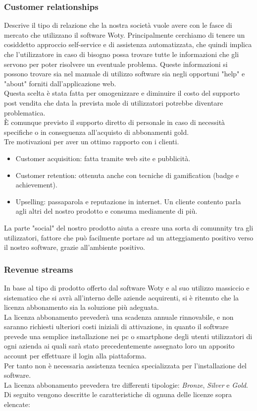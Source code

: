 \subsubsection{Customer relationships}
Descrive il tipo di relazione che la nostra società vuole avere con le fasce di mercato che utilizzano il software Woty. Principalmente cerchiamo di tenere un cosiddetto approccio self-service e di assistenza automatizzata, che quindi implica che l'utilizzatore in caso di bisogno possa trovare tutte le informazioni che gli servono per poter risolvere un eventuale problema. Queste informazioni si possono trovare sia nel manuale di utilizzo software sia negli opportuni "help" e "about" forniti dall'applicazione web.\\
Questa scelta è stata fatta per omogenizzare e diminuire il costo del supporto post vendita che data la prevista mole di utilizzatori potrebbe diventare problematica.\\
È comunque previsto il supporto diretto di personale in caso di necessità specifiche o in conseguenza all'acquisto di abbonamenti gold. \\ Tre motivazioni per aver un ottimo rapporto con i clienti.
\begin{itemize}
\item Customer acquisition: fatta tramite web site e pubblicità.
\item Customer retention: ottenuta anche con tecniche di gamification (badge e achievement).
\item Upselling: passaparola e reputazione in internet. Un cliente contento parla agli altri del nostro prodotto e consuma mediamente di più.
\end{itemize}
La parte "social" del nostro prodotto aiuta a creare una sorta di comunnity tra gli utilizzatori, fattore che può facilmente portare ad un atteggiamento positivo verso il nostro software, grazie all'ambiente positivo.

\subsubsection{Revenue streams}
In base al tipo di prodotto offerto dal software Woty e al suo utilizzo massiccio e sistematico che si avrà all'interno delle aziende acquirenti, si è ritenuto che la licenza abbonamento sia la soluzione più adeguata.\\
La licenza abbonamento prevederà una scadenza annuale rinnovabile, e non saranno richiesti ulteriori costi iniziali di attivazione, in quanto il software prevede una semplice installazione nei pc o smartphone degli utenti utilizzatori di ogni azienda ai quali sarà stato precedentemente assegnato loro un apposito account per effettuare il login alla piattaforma.\\
Per tanto non è necessaria assistenza tecnica specializzata per l'installazione del software.\\
La licenza abbonamento prevedera tre differenti tipologie: \textit{Bronze}, \textit{Silver} e \textit{Gold}.
Di seguito vengono descritte le caratteristiche di ognuna delle licenze sopra elencate:

